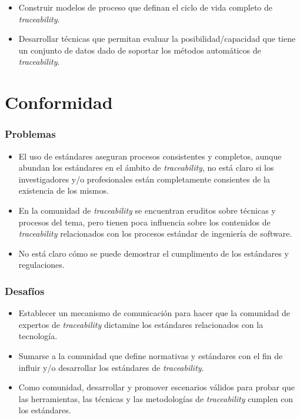 \documentclass[a4paper,12pt,oneside,spanish]{book}
\begin{document}
\begin{itemize}[label={\checkmark}]

\item Construir modelos de proceso que definan el ciclo de vida completo de \textit{traceability}.

\item Desarrollar técnicas que permitan evaluar la posibilidad/capacidad que tiene un conjunto de datos dado de soportar los métodos automáticos de \textit{traceability}.
 
\end{itemize}

\section{Conformidad}

\subsubsection{Problemas}

\begin{itemize}[label={$\times$}]

\item El uso de estándares aseguran procesos consistentes y completos, aunque abundan los estándares en el ámbito de \textit{traceability}, no está claro si los investigadores y/o profesionales están completamente consientes de la existencia de los mismos.

\item En la comunidad de \textit{traceability} se encuentran eruditos sobre técnicas y procesos del tema, pero tienen poca influencia sobre los contenidos de \textit{traceability} relacionados con los procesos estándar de ingeniería de software.

\item No está claro cómo se puede demostrar el cumplimento de los estándares y regulaciones.

\end{itemize}

\subsubsection{Desafíos}

\begin{itemize}[label={\checkmark}]

\item Establecer un mecanismo de comunicación para hacer que la comunidad de expertos de \textit{traceability} dictamine los estándares relacionados con la tecnología.

\item Sumarse a la comunidad que define normativas y estándares con el fin de influir y/o desarrollar los estándares de \textit{traceability}.

\item Como comunidad, desarrollar y promover escenarios válidos para probar que las herramientas, las técnicas y las metodologías de \textit{traceability} cumplen con los estándares.

\end{itemize}
\end{document}
